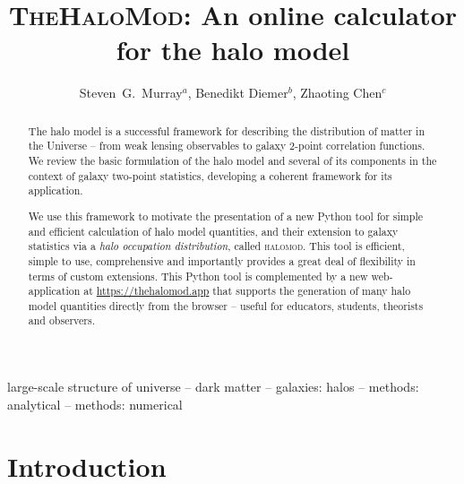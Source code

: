 \documentclass[5p,aas_macros]{elsarticle}
\newcommand{\halomod}{\textsc{halomod}}
\begin{document}
\begin{frontmatter}

\title{\textsc{TheHaloMod}: An online calculator for the halo model}

\author{Steven~G.~Murray$^a$, Benedikt Diemer$^b$, Zhaoting Chen$^c$}
\address{$^a$ Arizona State University, Tempe, AZ, USA \\
$^b$ Department of Astronomy, University of Maryland, College Park, MD 20742, USA\\
$^c$ Jodrell Bank Centre for Astrophysics, School of Physics and Astronomy, The University of Manchester, Manchester M13 9PL, UK}



\begin{abstract}
The halo model is a successful framework for describing the distribution of matter in the Universe -- from weak lensing observables to galaxy 2-point correlation functions. We review the basic formulation of the halo model and several of its components in the context of galaxy two-point statistics, developing a coherent framework for its application.

We use this framework to motivate the presentation of a new Python tool for simple and efficient calculation of halo model quantities, and their extension to galaxy statistics via a \textit{halo occupation distribution}, called \halomod. This tool is efficient, simple to use, comprehensive and importantly provides a great deal of flexibility in terms of custom extensions. 
This Python tool is complemented by a new web-application at \url{https://thehalomod.app} that supports the generation of many halo model quantities directly from the browser -- useful for educators, students, theorists and observers.

\end{abstract}

\begin{keyword}
large-scale structure of universe --
dark matter --
galaxies: halos --
methods: analytical --
methods: numerical
\end{keyword}

\end{frontmatter}


\section{Introduction}
\end{document}
